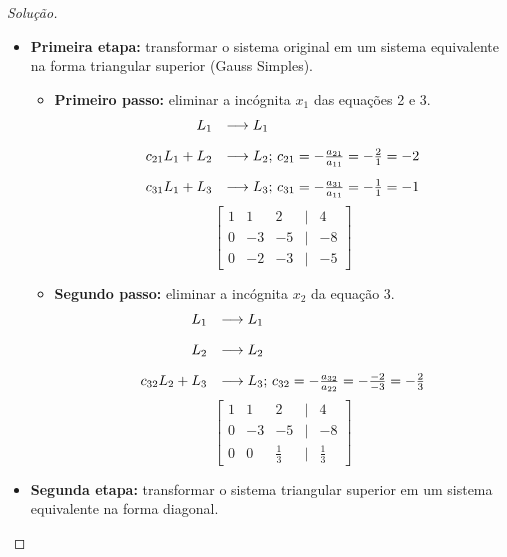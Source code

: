 \documentclass[
	12pt,				%
	openright,			%
	twoside,			%
	a4paper,			%
	english,			%
	french,				%
	brazil,				%
	sumario=tradicional
]{abntex2}
\newenvironment{solution}{
	\begin{proof}[Solução]
}{\end{proof}}
\numberwithin{example}{chapter}
\numberwithin{remark}{chapter}
\numberwithin{definition}{chapter}
\numberwithin{figure}{chapter}
\begin{document}
\begin{solution}\hfill
    \begin{itemize}
        \item \textbf{Primeira etapa: } transformar o sistema original em um sistema equivalente na forma triangular superior (Gauss Simples).

        \begin{itemize}
            \item \textbf{Primeiro passo: } eliminar a incógnita $x_1$ das equações 2 e 3.
            $$
            	\begin{array}{r l}
	                L_1 & \longrightarrow L_1\\[10pt]
                	c_{21}L_1+L_2 & \longrightarrow L_2\text{; } c_{21}=-\frac{a_{21}}{a_{11}}=-\frac{2}{1}=-2\\[10pt]
            	    c_{31}L_1+L_3 & \longrightarrow L_3\text{; } c_{31}=-\frac{a_{31}}{a_{11}}=-\frac{1}{1}=-1
                \end{array}
            $$
            $$
	            \begin{bmatrix}
                	1 & 1 & 2 &|& 4\\
	                0 & -3 & -5 &|& -8\\
        	        0 & -2 & -3 &|& -5
        	    \end{bmatrix}
	        $$

            \item \textbf{Segundo passo: } eliminar a incógnita $x_2$ da equação 3.
            $$
            	\begin{array}{r l}
	                L_1 & \longrightarrow L_1\\[10pt]
                	L_2 & \longrightarrow L_2\\[10pt]
            	    c_{32}L_2+L_3 & \longrightarrow L_3\text{; } c_{32}=-\frac{a_{32}}{a_{22}}=-\frac{-2}{-3}=-\frac{2}{3}
                \end{array}
            $$
            $$
	            \begin{bmatrix}
                	1 & 1 & 2 &|& 4\\
	                0 & -3 & -5 &|& -8\\
        	        0 & 0 & \frac{1}{3} &|& \frac{1}{3}
        	    \end{bmatrix}
	        $$
        \end{itemize}

        \item \textbf{Segunda etapa: } transformar o sistema triangular superior em um sistema equivalente na forma diagonal.


\end{itemize}
\end{solution}
\end{document}
